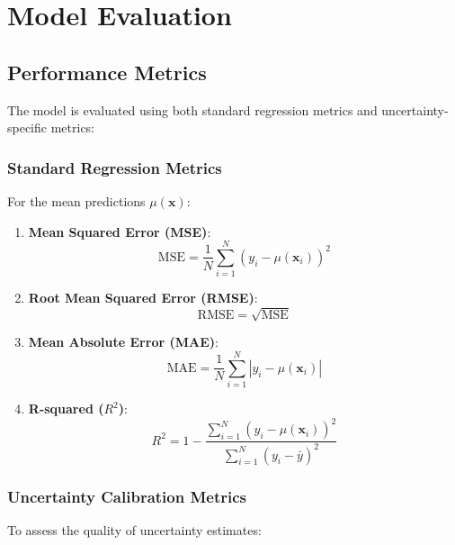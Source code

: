 \documentclass[11pt,a4paper]{article}
\begin{document}
\section{Model Evaluation}

\subsection{Performance Metrics}

The model is evaluated using both standard regression metrics and uncertainty-specific metrics:

\subsubsection{Standard Regression Metrics}

For the mean predictions $\mu(\mathbf{x})$:

\begin{enumerate}
    \item \textbf{Mean Squared Error (MSE)}:
    \begin{equation}
    \text{MSE} = \frac{1}{N}\sum_{i=1}^N (y_i - \mu(\mathbf{x}_i))^2
    \end{equation}

    \item \textbf{Root Mean Squared Error (RMSE)}:
    \begin{equation}
    \text{RMSE} = \sqrt{\text{MSE}}
    \end{equation}

    \item \textbf{Mean Absolute Error (MAE)}:
    \begin{equation}
    \text{MAE} = \frac{1}{N}\sum_{i=1}^N |y_i - \mu(\mathbf{x}_i)|
    \end{equation}

    \item \textbf{R-squared ($R^2$)}:
    \begin{equation}
    R^2 = 1 - \frac{\sum_{i=1}^N (y_i - \mu(\mathbf{x}_i))^2}{\sum_{i=1}^N (y_i - \bar{y})^2}
    \end{equation}
\end{enumerate}

\subsubsection{Uncertainty Calibration Metrics}

To assess the quality of uncertainty estimates:
\end{document}
